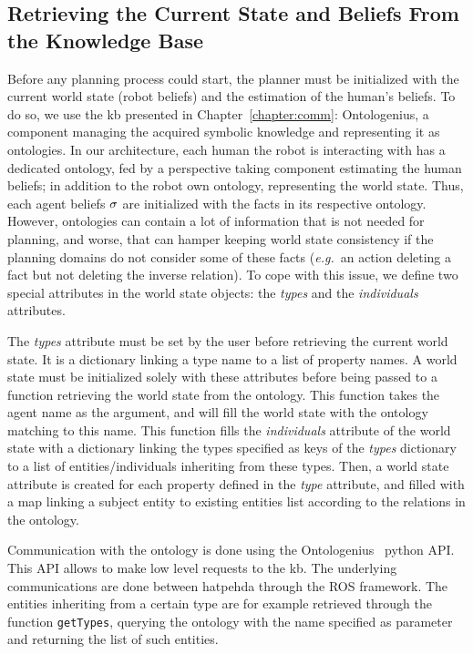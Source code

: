 \documentclass[a4paper,11pt,twoside]{StyleThese}
\begin{document}
\subsection{Retrieving the Current State and Beliefs From the Knowledge Base}
Before any planning process could start, the planner must be initialized with the current world state (robot beliefs) and the estimation of the human's beliefs. To do so, we use the \acrfull{kb} presented in Chapter~\ref{chapter:comm}: Ontologenius, a component managing the acquired symbolic knowledge and representing it as ontologies. In our architecture, each human the robot is interacting with has a dedicated ontology, fed by a perspective taking component estimating the human beliefs; in addition to the robot own ontology, representing the world state. Thus, each agent beliefs $\sigma$ are initialized with the facts in its respective ontology.
However, ontologies can contain a lot of information that is not needed for planning, and worse, that can hamper keeping world state consistency if the planning domains do not consider some of these facts (\textit{e.g.}~an action deleting a fact but not deleting the inverse relation). To cope with this issue, we define two special attributes in the world state objects: the \textit{types} and the \textit{individuals} attributes.

The \textit{types} attribute must be set by the user before retrieving the current world state. It is a dictionary linking a type name to a list of property names. A world state must be initialized solely with these attributes before being passed to a function retrieving the world state from the ontology. This function takes the agent name as the argument, and will fill the world state with the ontology matching to this name. This function fills the \textit{individuals} attribute of the world state with a dictionary linking the types specified as keys of the  \textit{types} dictionary to a list of entities/individuals inheriting from these types. Then, a world state attribute is created for each property defined in the \textit{type} attribute, and filled with a map linking a subject entity to existing entities list according to the relations in the ontology. 

Communication with the ontology is done using the Ontologenius~\cite{sarthou2019ontologenius} python API. This API allows to make low level requests to the \acrshort{kb}. The underlying communications are done between \acrshort{hatpehda} through the ROS framework. The entities inheriting from a certain type are for example retrieved through the function \verb'getTypes', querying the ontology with the name specified as parameter and returning the list of such entities.
\end{document}
